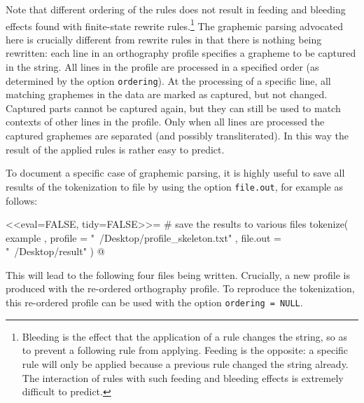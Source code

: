 Note that different ordering of the rules does not result in 
feeding and bleeding effects found with finite-state rewrite
rules.\footnote{Bleeding is the effect that the application of a rule changes
the string, so as to prevent a following rule from applying. Feeding is the opposite: a
specific rule will only be applied because a previous rule changed the string
already. The interaction of rules with such feeding and bleeding effects is
extremely difficult to predict.} The graphemic parsing advocated here is 
crucially different from rewrite rules in that there is nothing being rewritten:
each line in an orthography profile specifies a grapheme to be captured in the 
string. All lines in the profile are processed in a specified order (as determined
by the option \texttt{ordering}). At the processing of a specific line, all 
matching graphemes in the data are marked as captured, but not changed. 
Captured parts cannot be captured again, but they can still be used to match 
contexts of other lines in the profile. Only when all lines are processed the 
captured graphemes are separated (and possibly transliterated). In this way the 
result of the applied rules is rather easy to predict.

To document a specific case of graphemic parsing, it is highly useful to save
all results of the tokenization to file by using the option \texttt{file.out},
for example as follows: 

<<eval=FALSE, tidy=FALSE>>= 
# save the results to various files
tokenize( example
         , profile = "~/Desktop/profile_skeleton.txt"
         , file.out = "~/Desktop/result"
        )
@

This will lead to the following four files being written. Crucially, a
new profile is produced with the re-ordered orthography profile. To reproduce
the tokenization, this re-ordered profile can be used with the option
\texttt{ordering~=~NULL}.

